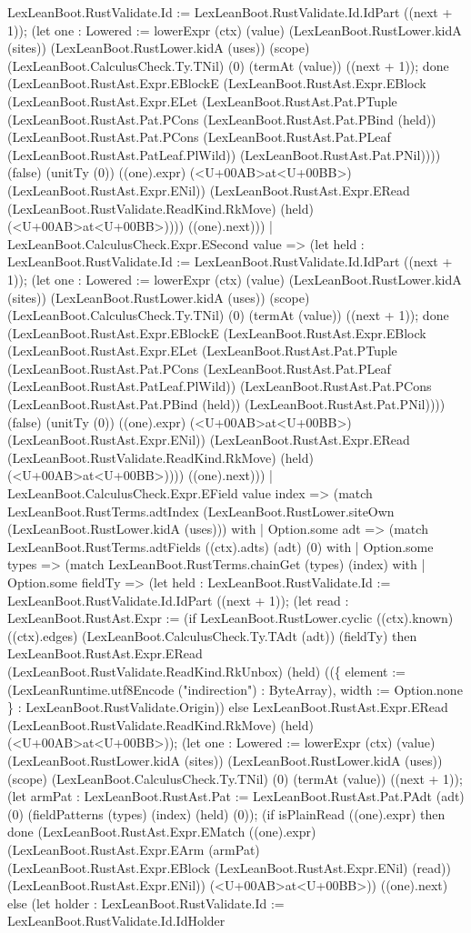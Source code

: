 \documentclass[11pt]{article}
\begin{document}
LexLeanBoot.RustValidate.Id := LexLeanBoot.RustValidate.Id.IdPart ((next + 1)); (let one : Lowered := lowerExpr (ctx) (value) (LexLeanBoot.RustLower.kidA (sites)) (LexLeanBoot.RustLower.kidA (uses)) (scope) (LexLeanBoot.CalculusCheck.Ty.TNil) (0) (termAt (value)) ((next + 1)); done (LexLeanBoot.RustAst.Expr.EBlockE (LexLeanBoot.RustAst.Expr.EBlock (LexLeanBoot.RustAst.Expr.ELet (LexLeanBoot.RustAst.Pat.PTuple (LexLeanBoot.RustAst.Pat.PCons (LexLeanBoot.RustAst.Pat.PBind (held)) (LexLeanBoot.RustAst.Pat.PCons (LexLeanBoot.RustAst.Pat.PLeaf (LexLeanBoot.RustAst.PatLeaf.PlWild)) (LexLeanBoot.RustAst.Pat.PNil)))) (false) (unitTy (0)) ((one).expr) (<U+00AB>at<U+00BB>) (LexLeanBoot.RustAst.Expr.ENil)) (LexLeanBoot.RustAst.Expr.ERead (LexLeanBoot.RustValidate.ReadKind.RkMove) (held) (<U+00AB>at<U+00BB>)))) ((one).next))) | LexLeanBoot.CalculusCheck.Expr.ESecond value => (let held : LexLeanBoot.RustValidate.Id := LexLeanBoot.RustValidate.Id.IdPart ((next + 1)); (let one : Lowered := lowerExpr (ctx) (value) (LexLeanBoot.RustLower.kidA (sites)) (LexLeanBoot.RustLower.kidA (uses)) (scope) (LexLeanBoot.CalculusCheck.Ty.TNil) (0) (termAt (value)) ((next + 1)); done (LexLeanBoot.RustAst.Expr.EBlockE (LexLeanBoot.RustAst.Expr.EBlock (LexLeanBoot.RustAst.Expr.ELet (LexLeanBoot.RustAst.Pat.PTuple (LexLeanBoot.RustAst.Pat.PCons (LexLeanBoot.RustAst.Pat.PLeaf (LexLeanBoot.RustAst.PatLeaf.PlWild)) (LexLeanBoot.RustAst.Pat.PCons (LexLeanBoot.RustAst.Pat.PBind (held)) (LexLeanBoot.RustAst.Pat.PNil)))) (false) (unitTy (0)) ((one).expr) (<U+00AB>at<U+00BB>) (LexLeanBoot.RustAst.Expr.ENil)) (LexLeanBoot.RustAst.Expr.ERead (LexLeanBoot.RustValidate.ReadKind.RkMove) (held) (<U+00AB>at<U+00BB>)))) ((one).next))) | LexLeanBoot.CalculusCheck.Expr.EField value index => (match LexLeanBoot.RustTerms.adtIndex (LexLeanBoot.RustLower.siteOwn (LexLeanBoot.RustLower.kidA (uses))) with | Option.some adt => (match LexLeanBoot.RustTerms.adtFields ((ctx).adts) (adt) (0) with | Option.some types => (match LexLeanBoot.RustTerms.chainGet (types) (index) with | Option.some fieldTy => (let held : LexLeanBoot.RustValidate.Id := LexLeanBoot.RustValidate.Id.IdPart ((next + 1)); (let read : LexLeanBoot.RustAst.Expr := (if LexLeanBoot.RustLower.cyclic ((ctx).known) ((ctx).edges) (LexLeanBoot.CalculusCheck.Ty.TAdt (adt)) (fieldTy) then LexLeanBoot.RustAst.Expr.ERead (LexLeanBoot.RustValidate.ReadKind.RkUnbox) (held) ((\{ element := (LexLeanRuntime.utf8Encode ("indirection") : ByteArray), width := Option.none \} : LexLeanBoot.RustValidate.Origin)) else LexLeanBoot.RustAst.Expr.ERead (LexLeanBoot.RustValidate.ReadKind.RkMove) (held) (<U+00AB>at<U+00BB>)); (let one : Lowered := lowerExpr (ctx) (value) (LexLeanBoot.RustLower.kidA (sites)) (LexLeanBoot.RustLower.kidA (uses)) (scope) (LexLeanBoot.CalculusCheck.Ty.TNil) (0) (termAt (value)) ((next + 1)); (let armPat : LexLeanBoot.RustAst.Pat := LexLeanBoot.RustAst.Pat.PAdt (adt) (0) (fieldPatterns (types) (index) (held) (0)); (if isPlainRead ((one).expr) then done (LexLeanBoot.RustAst.Expr.EMatch ((one).expr) (LexLeanBoot.RustAst.Expr.EArm (armPat) (LexLeanBoot.RustAst.Expr.EBlock (LexLeanBoot.RustAst.Expr.ENil) (read)) (LexLeanBoot.RustAst.Expr.ENil)) (<U+00AB>at<U+00BB>)) ((one).next) else (let holder : LexLeanBoot.RustValidate.Id := LexLeanBoot.RustValidate.Id.IdHolder 
\end{document}
